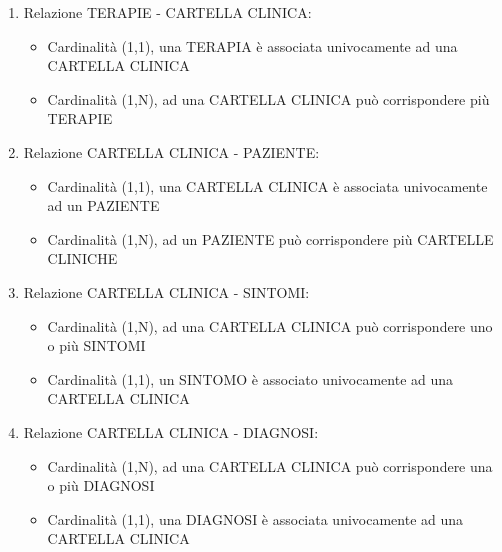 \documentclass[a4paper,titlepage]{article}
\begin{document}
\begin{enumerate}

\item Relazione TERAPIE - CARTELLA CLINICA:

\begin{itemize}[leftmargin=0.5cm, topsep=0.25cm, itemsep=0.2cm]

\item Cardinalità (1,1), una TERAPIA è associata univocamente ad una CARTELLA CLINICA
\item Cardinalità (1,N), ad una CARTELLA CLINICA può corrispondere più TERAPIE

\end{itemize}

\item Relazione CARTELLA CLINICA - PAZIENTE:

\begin{itemize}[leftmargin=0.5cm, topsep=0.25cm, itemsep=0.2cm]

\item Cardinalità (1,1), una CARTELLA CLINICA è associata univocamente ad un PAZIENTE
\item Cardinalità (1,N), ad un PAZIENTE può corrispondere più CARTELLE CLINICHE

\end{itemize}

\item Relazione CARTELLA CLINICA - SINTOMI:

\begin{itemize}[leftmargin=0.5cm, topsep=0.25cm, itemsep=0.2cm]

\item Cardinalità (1,N), ad una CARTELLA CLINICA può corrispondere uno o più SINTOMI
\item Cardinalità (1,1), un SINTOMO è associato univocamente ad una CARTELLA CLINICA

\end{itemize}

\item Relazione CARTELLA CLINICA - DIAGNOSI:

\begin{itemize}[leftmargin=0.5cm, topsep=0.25cm, itemsep=0.2cm]

\item Cardinalità (1,N), ad una CARTELLA CLINICA può corrispondere una o più DIAGNOSI
\item Cardinalità (1,1), una DIAGNOSI è associata univocamente ad una CARTELLA CLINICA


\end{itemize}
\end{enumerate}
\end{document}
